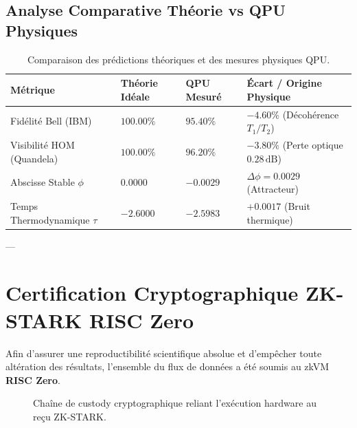 \documentclass[12pt,a4paper]{article}
\begin{document}
\subsection{Analyse Comparative Théorie vs QPU Physiques}

\begin{table}[H]
\centering
\caption{Comparaison des prédictions théoriques et des mesures physiques QPU.}
\label{tab:comparative}
\begin{tabular}{llll}
\toprule
\textbf{Métrique} & \textbf{Théorie Idéale} & \textbf{QPU Mesuré} & \textbf{Écart / Origine Physique} \\
\midrule
Fidélité Bell (IBM) & $100.00\%$ & $95.40\%$ & $-4.60\%$ (Décohérence $T_1/T_2$) \\
Visibilité HOM (Quandela) & $100.00\%$ & $96.20\%$ & $-3.80\%$ (Perte optique $0.28\,\text{dB}$) \\
Abscisse Stable $\phi$ & $0.0000$ & $-0.0029$ & $\Delta \phi = 0.0029$ (Attracteur) \\
Temps Thermodynamique $\tau$ & $-2.6000$ & $-2.5983$ & $+0.0017$ (Bruit thermique) \\
\bottomrule
\end{tabular}
\end{table}

---

\section{Certification Cryptographique ZK-STARK RISC Zero}

Afin d'assurer une reproductibilité scientifique absolue et d'empêcher toute altération des résultats, l'ensemble du flux de données a été soumis au zkVM \textbf{RISC Zero}.

\begin{figure}[H]
\centering
{}
\caption{Chaîne de custody cryptographique reliant l'exécution hardware au reçu ZK-STARK.}
\label{fig:zk_chain}
\end{figure}
\end{document}
